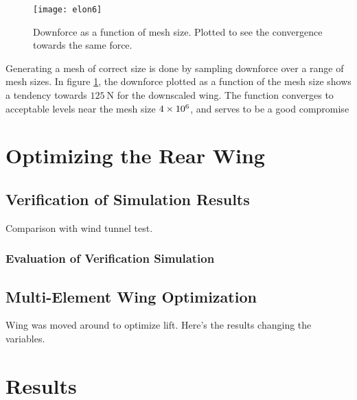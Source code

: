   \begin{figure}
    \texttt{[image: elon6]}
    \label{fig:DFprmeshsize}
    \caption{Downforce as a function of mesh size. Plotted to see the convergence towards the same force.}
  \end{figure}

  Generating a mesh of correct size is done by sampling downforce over a range of mesh sizes. In figure \ref{fig:DFprmeshsize}, the downforce plotted as a function of the mesh size shows a tendency towards $\SI{125}{\newton}$ for the downscaled wing. The function converges to acceptable levels near the mesh size $\SI{4E6}{}$, and serves to be a good compromise

\section{Optimizing the Rear Wing}


  \subsection{Verification of Simulation Results}
  \label{sec:simulationcomparison}

  Comparison with wind tunnel test.

  \subsubsection{Evaluation of Verification Simulation}

  \subsection{Multi-Element Wing Optimization}
  Wing was moved around to optimize lift. Here's the results changing the variables.

\section{Results}

